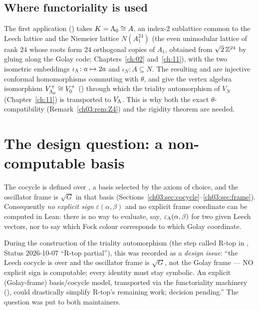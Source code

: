 \subsection{Where functoriality is used}

The first application () takes $K={\Lambda}_0\cong A$, an
index-$2$ sublattice common to the Leech lattice and the Niemeier lattice $N(A_1^{24})$ (the
even unimodular lattice of rank $24$ whose roots form $24$ orthogonal copies of $A_1$, obtained
from $\sqrt2\,{\mathbb{Z}}^{24}$ by gluing along the Golay code; Chapters~\ref{ch:02} and~\ref{ch:11}), with the
two isometric embeddings $\iota_{\Lambda}\colon a\mapsto 2a$ and $\iota_N\colon A\subseteq N$. The
resulting  and 
are injective conformal homomorphisms commuting with $\theta$, and give the vertex algebra
isomorphism $V_{{\Lambda}_0}^+\cong V_0^+$ () through which the triality
automorphism of $V_{N}$ (Chapter~\ref{ch:11}) is transported to $V_{\Lambda}$. This is why both the
exact $\theta$-compatibility (Remark~\ref{ch03:rem:Z4}) and the rigidity theorem are needed.

\section{The design question: a non-computable basis}\label{ch03:sec:design}

The cocycle  is defined over , a basis selected
by the axiom of choice, and the oscillator frame is $\sqrt G$ in that basis
(Sections~\ref{ch03:sec:cocycle}--\ref{ch03:sec:frame}). Consequently \emph{no explicit sign}
$\varepsilon(\alpha,\beta)$ and no explicit frame coordinate can be computed in Lean: there is no
way to evaluate, say, $\varepsilon_{\Lambda}(\alpha,\beta)$ for two given Leech vectors, nor to say
which Fock colour corresponds to which Golay coordinate.

During the construction of the triality automorphism (the step called R-top in
, Status 2026-10-07 ``R-top partial''), this was recorded as a
\emph{design issue}: ``the Leech cocycle is  over
 and the oscillator frame is $\sqrt G$, not the Golay frame --- NO
explicit sign is computable; every identity must stay symbolic. An explicit (Golay-frame)
basis/cocycle model, transported via the functoriality machinery (), could
drastically simplify R-top's remaining work; decision pending.'' The question was put to both
maintainers.


